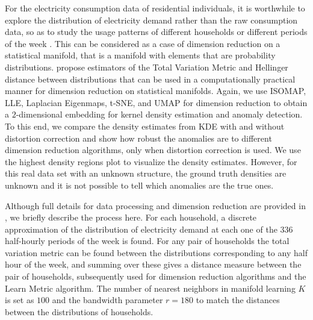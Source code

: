 \documentclass[12pt]{article}
\begin{document}
For the electricity consumption data of residential individuals, it is worthwhile to explore the distribution of electricity demand rather than the raw consumption data, so as to study the usage patterns of different households or different periods of the week \autocite{Hyndman2018-ia}. This can be considered as a case of dimension reduction on a statistical manifold, that is a manifold with elements that are probability distributions. \textcite{Cheng2021-dh} propose estimators of the Total Variation Metric and Hellinger distance between distributions that can be used in a computationally practical manner for dimension reduction on statistical manifolds. Again, we use ISOMAP, LLE, Laplacian Eigenmaps, t-SNE, and UMAP for dimension reduction to obtain a \(2\)-dimensional embedding for kernel density estimation and anomaly detection. To this end, we compare the density estimates from KDE with and without distortion correction and show how robust the anomalies are to different dimension reduction algorithms, only when distortion correction is used. We use the highest density regions plot to visualize the density estimates. However, for this real data set with an unknown structure, the ground truth densities are unknown and it is not possible to tell which anomalies are the true ones.

Although full details for data processing and dimension reduction are provided in \textcite{Cheng2021-dh}, we briefly describe the process here. For each household, a discrete approximation of the distribution of electricity demand at each one of the \(336\) half-hourly periods of the week is found. For any pair of households the total variation metric can be found between the distributions corresponding to any half hour of the week, and summing over these gives a distance measure between the pair of households, subsequently used for dimension reduction algorithms and the Learn Metric algorithm. The number of nearest neighbors in manifold learning \(K\) is set as \(100\) and the bandwidth parameter \(r=180\) to match the distances between the distributions of households.
\end{document}
